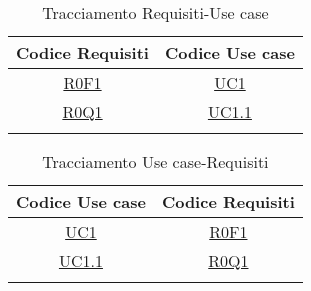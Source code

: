 \normalsize
\begin{longtable}{|c|c|}
\hline
\textbf{Codice Requisiti} & \textbf{Codice Use case} \\
\hline
\endhead
\hyperlink{R0F1}{R0F1} & \hyperlink{UC1}{UC1}\\
\hline
\hyperlink{R0Q1}{R0Q1} & \hyperlink{UC1.1}{UC1.1}\\
\hline
\caption[Tracciamento Requisiti-Use case]{Tracciamento Requisiti-Use case}
\label{tabella:requi-usecase}
\end{longtable}
\clearpage
\normalsize
\begin{longtable}{|c|c|}
\hline
\textbf{Codice Use case} & \textbf{Codice Requisiti} \\
\hline
\endhead
\hyperlink{UC1}{UC1} & \hyperlink{R0F1}{R0F1}\\
\hline
\hyperlink{UC1.1}{UC1.1} & \hyperlink{R0Q1}{R0Q1}\\
\hline
\caption[Tracciamento Use case-Requisiti]{Tracciamento Use case-Requisiti}
\label{tabella:requi-usecase}
\end{longtable}
\clearpage
